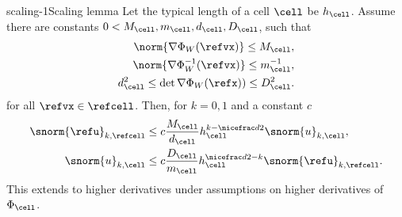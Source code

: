 \begin{Lemma*}{scaling-1}{Scaling lemma}
  Let the typical length of a cell $\cell$ be $h_\cell$. Assume there
  are constants $0 < M_\cell, m_\cell, d_\cell, D_\cell$, such that
  \begin{gather}
    \begin{split}
      \norm{\nabla\Phi_W(\refvx)} \le M_\cell,
      \\
      \norm{\nabla\Phi_W^{-1}(\refvx)} \le m_\cell^{-1} ,
      \\
      d^2_\cell \le \det \nabla\Phi_W(\refx)) \le D^2_\cell.      
    \end{split}
  \end{gather}
  for all $\refvx\in\refcell$. Then, for $k=0,1$ and a constant $c$
  \begin{gather}
    \begin{split}
      \snorm{\refu}_{k,\refcell}
      &\le c \frac{M_\cell}{d_\cell}  h_\cell^{k-\nicefrac d2}
      \snorm{u}_{k,\cell},\\
      \snorm{u}_{k,\cell}
      &\le c \frac{D_\cell}{m_\cell} h_\cell^{\nicefrac d2-k}
      \snorm{\refu}_{k,\refcell}.
    \end{split}
  \end{gather}
  This extends to higher derivatives under assumptions on higher
  derivatives of $\Phi_\cell$.
\end{Lemma*}


